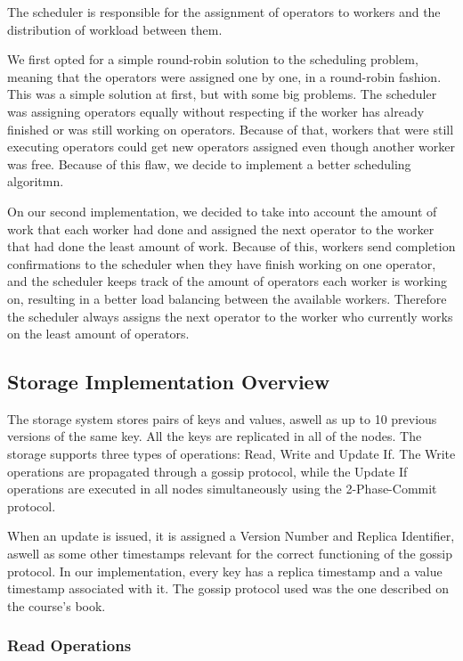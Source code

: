 \documentclass[times, 10pt,twocolumn]{article}
\begin{document}
The scheduler is responsible for the assignment of operators to workers and the distribution of workload between them.


We first opted for a simple round-robin solution to the scheduling problem, meaning that the operators were assigned one by one, in a round-robin fashion.
This was a simple solution at first, but with some big problems.
The scheduler was assigning operators equally without respecting if the worker has already finished or was still working on operators. 
Because of that, workers that were still executing operators could get new operators assigned even though another worker was free.
Because of this flaw, we decide to implement a better scheduling algoritmn.

On our second implementation, we decided to take into account the amount of work that each worker had done and assigned the next operator to the worker that had done the least amount of work. 
Because of this, workers send completion confirmations to the scheduler when they have finish working on one operator, and the scheduler keeps track of the amount of operators each worker is working on, resulting in a better load balancing between the available workers.
Therefore the scheduler always assigns the next operator to the worker who currently works on the least amount of operators.


\subsection{Storage Implementation Overview}
The storage system stores pairs of keys and values, aswell as up to 10 previous versions of the same key. All the keys are
replicated in all of the nodes. The storage supports three types of operations: Read, Write and Update If. The Write operations are
propagated through a gossip protocol, while the Update If operations are executed in all nodes simultaneously using the 2-Phase-Commit
protocol.

When an update is issued, it is assigned a Version Number and Replica Identifier, aswell as some other timestamps relevant for the correct 
functioning of the gossip protocol. In our implementation, every key has a replica timestamp and a value timestamp associated with it. 
The gossip protocol used was the one described on the course's book.

\subsubsection{Read Operations}
\end{document}
